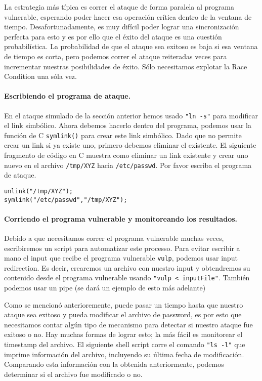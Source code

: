 La estrategia más típica es correr el ataque de forma paralela al programa vulnerable, esperando poder hacer esa operación crítica dentro de la ventana de tiempo. Desafortunadamente, es muy difícil poder lograr una sincronización perfecta para esto y es por ello que el éxito del ataque es una cuestión probabilística. La probabilidad de que el ataque sea exitoso es baja si esa ventana de tiempo es corta, pero podemos correr el ataque reiteradas veces para incrementar nuestras posibilidades de éxito.
Sólo necesitamos explotar la Race Condition una sóla vez.


\paragraph{Escribiendo el programa de ataque.} En el ataque simulado de la sección anterior hemos usado \texttt{"ln -s"} para modificar el link simbólico. Ahora debemos hacerlo dentro del programa, podemos usar la función de C {\tt symlink()} para crear este link simbólico. Dado que \linux no permite crear un link si ya existe uno, primero debemos eliminar el existente. El siguiente fragmento de código en C muestra como eliminar un link existente y crear uno nuevo en el archivo {\tt /tmp/XYZ} hacia {\tt /etc/passwd}. Por favor escriba el programa de ataque.

\begin{lstlisting}
unlink("/tmp/XYZ");
symlink("/etc/passwd","/tmp/XYZ");
\end{lstlisting}



\paragraph{Corriendo el programa vulnerable y monitoreando los resultados.}
Debido a que necesitamos correr el programa vulnerable muchas veces, escribiremos un script para automatizar este processo.
Para evitar escribir a mano el input que recibe el programa vulnerable \texttt{vulp}, podemos usar input redirection. Es decir, crearemos un archivo con nuestro input y obtendremos su contenido desde el programa vulnerable usando \texttt{"vulp < inputFile"}. También podemos usar un pipe (se dará un ejemplo de esto más adelante)

Como se mencionó anterioremente, puede pasar un tiempo hasta que nuestro ataque sea exitoso y pueda modificar el archivo de password, es por esto que necesitamos contar algún tipo de mecanismo para detectar si nuestro ataque fue exitoso o no. Hay muchas formas de lograr esto; la más fácil es monitorear el timestamp del archivo.
El siguiente shell script corre el comando \texttt{"ls -l"} que imprime información del archivo, incluyendo su última fecha de modificación. Comparando esta información con la obtenida anteriormente, podemos determinar si el archivo fue modificado o no.

